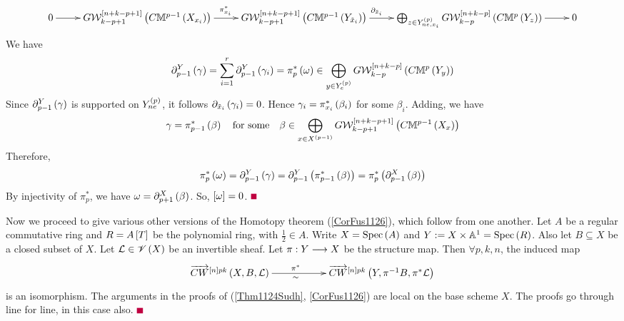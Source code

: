 \documentclass[12pt]{article}
\begin{document}
{
$$ 
\diagram 
0 \ar[r] &{G}{\CW}^{\LRt{n+k-p+1}}_{k-p+1}\LRf{C{\BM}^{p-1}\LRf{X_{x_i}}}
\ar[r]^{\pi^*_{x_i}} & {G}{\CW}_{k-p+1}^{\LRt{n+k-p+1}}\LRf{C{\BM}^{p-1}\LRf{Y_{\tilde{x}_i}}}
\ar[r]^{\partial_{\tilde{x}_i}\qquad} & \bigoplus _{z\in Y_{ne, x_i}^{\LRf{p}}}{G}{\CW}_{k-p}^{\LRt{n+k-p}}\LRf{C{\BM}^{p}\LRf{Y_z}}\ar[r] & 0\\
\enddiagram
$$
}
We have 
$$
\partial^Y_{p-1}\left( \gamma\right) =\sum_{i=1}^r\partial^Y_{p-1}\left( \gamma_i\right) =\pi^*_p\left( \omega\right) \in 
\bigoplus_{y\in Y_e^{\left( p\right)}}G{\mathcal{W}}^{\left[ n+k-p\right]}_{k-p}\left( C{\mathbb{M}}^{p}\left( Y_y\right)\right)
$$
Since $\partial_{p-1}^Y\left( \gamma\right)$ is supported on $Y^{\left( p\right)}_{ne}$,
it follows   $\partial_{\tilde{x}_i}\left( \gamma_i\right)=0$. Hence $\gamma_i=\pi_{x_i}^*\left( \beta_i\right)$ for some 
$\beta_i$. Adding, we have 
$$
\gamma=\pi^*_{p-1}\left( \beta\right)\quad {\rm for ~some}\quad \beta\in 
\bigoplus_{x\in X^{\left( p-1\right)}}G{\mathcal{W}}_{k-p+1}^{\left[ n+k-p+1\right]}\left( C{\mathbb{M}}^{p-1}\left( X_x\right)\right)
$$
Therefore,
$$
\pi^*_p\left( \omega\right)= \partial^Y_{p-1}\left( \gamma\right) = \partial^Y_{p-1}\left( \pi^*_{p-1}\left( \beta\right)\right) 
=\pi_p^*\left( \partial_{p-1}^X\left( \beta\right)\right)
$$
By injectivity of $\pi_p^*$, we have $\omega=\partial_{p+1}^X\left( \beta\right)$. So, $\left[ \omega\right]=0$.
\pic $\eop$ 


\vspace{3mm}
Now we proceed to give various other versions of the Homotopy theorem (\ref{CorFus1126}), which follow from  one another.
\bT\label{Thm1124WithSupport}{\rm 
Let $A$ be a regular commutative ring and $R=A\left[ T\right]$ be the polynomial ring, with $\frac{1}{2}\in A$. Write $X=\mathrm{Spec}\left(A\right)$ and 
$Y:=X\times {\mathbb{A}}^1=\mathrm{Spec}\left(R\right)$. Also let $B\subseteq X$ be a closed subset of $X$. Let ${\mathcal{L}}\in {\mathscr {V}}\left( X\right)$
be an invertible sheaf. 
Let $\pi: Y \longrightarrow X$ be the structure map. Then $\forall p, k, n$,  the induced map
$$
\diagram 
\ora{CW}^{\LRt{n}pk} \LRf{X, B, {\CL}} \ar[rr]^{\pi^*\qquad}_{\sim\qquad} && \ora{CW}^{\LRt{n}pk}\LRf{Y, \pi^{-1}B, \pi^*{\CL}} \\
\enddiagram 
$$
is  an isomorphism.  
}
\eT
\pf The arguments in the proofs of (\ref{Thm1124Sudh}, \ref{CorFus1126}) are  local on the base scheme $X$. The proofs go through line for line, in this case also.
$\eop$  
\end{document}
